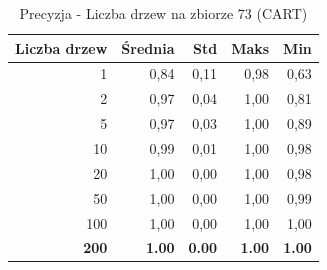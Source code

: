 \begin{table}[htbp]
\centering
\small
\setlength{\tabcolsep}{6pt}
\renewcommand{\arraystretch}{1.2}
\caption{Precyzja - Liczba drzew na zbiorze 73 (CART)}
\label{tab:CART_tree_count_73_precision}
\begin{tabular}{r|r|r|r|r}
\toprule
Liczba drzew & Średnia & Std & Maks & Min \\
\hline
1 & 0,84 & 0,11 & 0,98 & 0,63 \\
2 & 0,97 & 0,04 & 1,00 & 0,81 \\
5 & 0,97 & 0,03 & 1,00 & 0,89 \\
10 & 0,99 & 0,01 & 1,00 & 0,98 \\
20 & 1,00 & 0,00 & 1,00 & 0,98 \\
50 & 1,00 & 0,00 & 1,00 & 0,99 \\
100 & 1,00 & 0,00 & 1,00 & 1,00 \\
\textbf{200} & \textbf{1.00} & \textbf{0.00} & \textbf{1.00} & \textbf{1.00} \\
\bottomrule
\end{tabular}
\end{table}